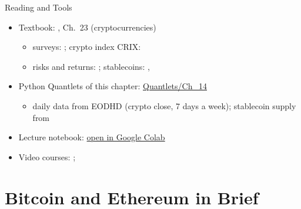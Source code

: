 \begin{frame}{Reading and Tools}
\itemsize{\small}
\begin{itemize}
    \item Textbook: , Ch.~23 (cryptocurrencies)
    \begin{itemize}
        \item surveys: ; crypto index CRIX: 
        \item risks and returns: ; stablecoins: , 
    \end{itemize}
    \item Python Quantlets of this chapter: \href{https://github.com/danpele/SFM/tree/main/Quantlets/Ch_14}{Quantlets/Ch\_14}
    \begin{itemize}
        \item daily data from EODHD (crypto close, 7 days a week); stablecoin supply from 
    \end{itemize}
    \item Lecture notebook: \href{\colaburl{notebooks/EN/chapter14_lecture_notebook.ipynb}}{open in Google Colab}
    \item Video courses: ; 
\end{itemize}
\end{frame}


\section{Bitcoin and Ethereum in Brief}

